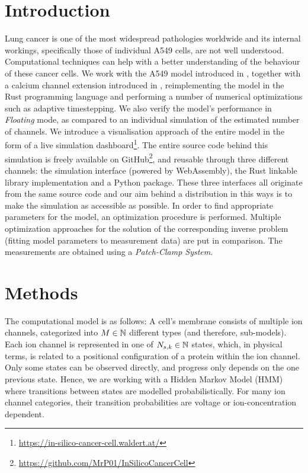 \documentclass[USenglish,twocolumn]{article}
\begin{document}
  \section{Introduction}
  Lung cancer is one of the most widespread pathologies worldwide and its internal workings, specifically those of individual A549 cells, are not well understood.
  Computational techniques can help with a better understanding of the behaviour of these cancer cells.
  We work with the A549 model introduced in \cite{2021-A549-model}, together with a calcium channel extension introduced in \cite{2024-calcium-channels}, reimplementing the model in the Rust programming language and performing a number of numerical optimizations such as adaptive timestepping.
  We also verify the model's performance in \textit{Floating} mode, as compared to an individual simulation of the estimated number of channels.
  We introduce a visualisation approach of the entire model in the form of a live simulation dashboard\footnote{\url{https://in-silico-cancer-cell.waldert.at/}}.
  The entire source code behind this simulation is freely available on GitHub\footnote{\url{https://github.com/MrP01/InSilicoCancerCell}}, and reusable through three different channels: the simulation interface (powered by WebAssembly), the Rust linkable library implementation and a Python package.
  These three interfaces all originate from the same source code and our aim behind a distribution in this ways is to make the simulation as accessible as possible.
  In order to find appropriate parameters for the model, an optimization procedure is performed.
  Multiple optimization approaches for the solution of the corresponding inverse problem (fitting model parameters to measurement data) are put in comparison.
  The measurements are obtained using a \textit{Patch-Clamp System}.

  \section{Methods}
  The computational model is as follows:
  A cell's membrane consists of multiple ion channels, categorized into $M \in \mathbb{N}$ different types (and therefore, sub-models).
  Each ion channel is represented in one of $N_{s, k} \in \mathbb{N}$ states, which, in physical terms, is related to a positional configuration of a protein within the ion channel.
  Only some states can be observed directly, and progress only depends on the one previous state.
  Hence, we are working with a Hidden Markov Model (HMM) where transitions between states are modelled probabilistically.
  For many ion channel categories, their transition probabilities are voltage or ion-concentration dependent.
\end{document}
